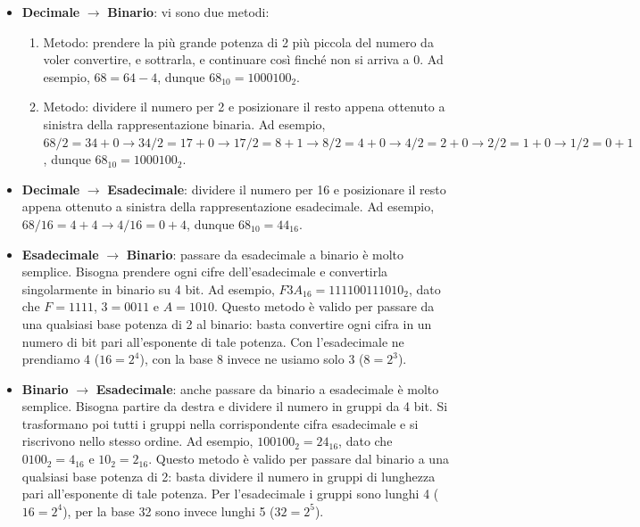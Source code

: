 \documentclass[11pt, a4paper, titlepage, oneside]{scrbook}
\begin{document}
\begin{itemize}
    \item \textbf{Decimale} $\longrightarrow$ \textbf{Binario}: vi sono due metodi:
    \begin{enumerate}[label=\arabic*°]
        \item Metodo: prendere la più grande potenza di 2 più piccola del numero da voler convertire, e sottrarla, e continuare così finché non si arriva a 0. Ad esempio, $68 = 64 - 4$, dunque $68_{10} = 1000100_2$.
        \item Metodo: dividere il numero per 2 e posizionare il resto appena ottenuto a sinistra della rappresentazione binaria. Ad esempio, $68/2 = 34 + 0 \longrightarrow 34/2 =  17 + 0 \longrightarrow 17/2 = 8 + 1 \longrightarrow 8/2 = 4 + 0 \longrightarrow 4/2 = 2 + 0 \longrightarrow 2/2 = 1 + 0 \longrightarrow 1/2 = 0 + 1$, dunque $68_{10} = 1000100_2$.
    \end{enumerate}
    \item \textbf{Decimale} $\longrightarrow$ \textbf{Esadecimale}: dividere  il numero per 16 e posizionare il resto appena ottenuto a sinistra della rappresentazione esadecimale. Ad esempio, $68/16 = 4 + 4 \longrightarrow 4/16 = 0 + 4$, dunque $68_{10} = 44_{16}$.
    \item \textbf{Esadecimale} $\longrightarrow$ \textbf{Binario}: passare da esadecimale a binario è molto semplice. Bisogna prendere ogni cifre dell'esadecimale e convertirla singolarmente in binario su 4 bit. Ad esempio, $F3A_{16} = 111100111010_2$, dato che $F = 1111$, $3 = 0011$ e $A = 1010$. Questo metodo è valido per passare da una qualsiasi base potenza di 2 al binario: basta convertire ogni cifra in un numero di bit pari all'esponente di tale potenza. Con l'esadecimale ne prendiamo 4 ($16 = 2^4$), con la base 8 invece ne usiamo solo 3 ($8 = 2^3$).
    \item \textbf{Binario} $\longrightarrow$ \textbf{Esadecimale}: anche passare da binario a esadecimale è molto semplice. Bisogna partire da destra e dividere il numero in gruppi da 4 bit. Si trasformano poi tutti i gruppi nella corrispondente cifra esadecimale e si riscrivono nello stesso ordine. Ad esempio, $100100_2 = 24_{16}$, dato che $0100_2 = 4_{16}$ e $10_2 = 2_{16}$. Questo metodo è valido per passare dal binario a una qualsiasi base potenza di 2: basta dividere il numero in gruppi di lunghezza pari all'esponente di tale potenza. Per l'esadecimale i gruppi sono lunghi 4 ($16 = 2^4$), per la base 32 sono invece lunghi 5 ($32 = 2^5$).
\end{itemize}
\end{document}
